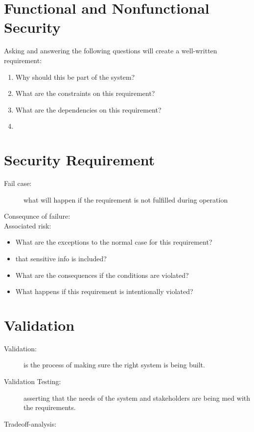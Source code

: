 \documentclass[a4paper]{article}
\begin{document}
	\section{Functional and Nonfunctional Security}
	Asking and answering the following questions will create a well-written requirement:
	\begin{enumerate}
		\item Why should this be part of the system?
		\item What are the constraints on this requirement?
		\item What are the dependencies on this requirement?
		\item %
	\end{enumerate}

	\section{Security Requirement}
	\begin{description}
		\item[Fail case:] what will happen if the requirement is not fulfilled during operation
		\item[Consequnce of failure:]
		\item[Associated risk:]
	\end{description}
	\begin{itemize}
		\item What are the exceptions to the normal case for this requirement?
		\item that sensitive info is included?
		\item What are the consequences if the conditions are violated?
		\item What happens if this requirement is intentionally violated?
	\end{itemize}



	
	\section{Validation}
	\begin{description}
		\item[Validation:] is the process of making sure the right system is being built.
		\item[Validation Testing:] asserting that the needs of the system and stakeholders
			are being med with the requirements.
		\item[Tradeoff-analysis:]
	\end{description}


	
\end{document}
